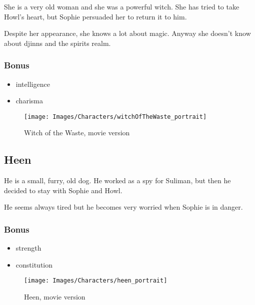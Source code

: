 \begin{minipage}[t]{0.5\textwidth}
She is a very old woman and she was a powerful witch. She has tried to take Howl’s heart, but Sophie persuaded her to return it to him.

Despite her appearance, she knows a lot about magic. Anyway she doesn’t know about djinns and the spirits realm.

\subsubsection{Bonus}
\begin{itemize}
	\item intelligence
	\item charisma
\end{itemize}

\end{minipage}%
%
\hfill
\begin{minipage}[t]{0.4\textwidth}
  \begin{figure}[H]
    \hfill\texttt{[image: Images/Characters/witchOfTheWaste\_portrait]}
    \caption{Witch of the Waste, movie version}
  \end{figure}
\end{minipage}

\subsection{Heen}

\begin{minipage}[t]{0.5\textwidth}
He is a small, furry, old dog. He worked as a spy for Suliman, but then he decided to stay with Sophie and Howl.

He seems always tired but he becomes very worried when Sophie is in danger.

\subsubsection{Bonus}
\begin{itemize}
	\item strength
	\item constitution
\end{itemize}

\end{minipage}%
%
\hfill
\begin{minipage}[t]{0.4\textwidth}
  \begin{figure}[H]
    \hfill\texttt{[image: Images/Characters/heen\_portrait]}
    \caption{Heen, movie version}
  \end{figure}
\end{minipage}%
%
